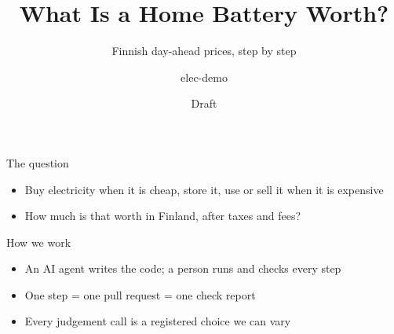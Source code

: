 \documentclass[aspectratio=169]{beamer}
\title{What Is a Home Battery Worth?}
\subtitle{Finnish day-ahead prices, step by step}
\author{elec-demo}
\date{Draft}
\begin{document}
\begin{frame}
  \titlepage
\end{frame}

\begin{frame}{The question}
  \begin{itemize}
    \item Buy electricity when it is cheap, store it, use or sell it when it is expensive
    \item How much is that worth in Finland, after taxes and fees?
  \end{itemize}
\end{frame}

\begin{frame}{How we work}
  \begin{itemize}
    \item An AI agent writes the code; a person runs and checks every step
    \item One step = one pull request = one check report
    \item Every judgement call is a registered choice we can vary
  \end{itemize}
\end{frame}
\end{document}
